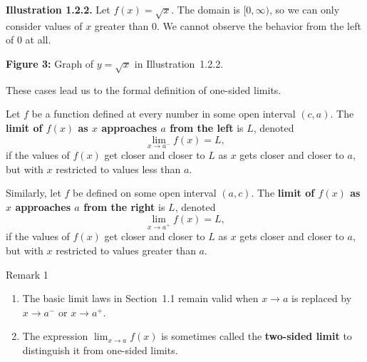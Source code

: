 \medskip
\textbf{Illustration 1.2.2.}
Let \(f(x) = \sqrt{x}\). The domain is \([0, \infty)\), so we can only consider values of \(x\) greater than 0. We cannot observe the behavior from the left of 0 at all.

\begin{center}

\smallskip
\textbf{Figure 3:} Graph of \(y = \sqrt{x}\) in Illustration~1.2.2.
\end{center}

\bigskip

These cases lead us to the formal definition of one-sided limits.

\medskip
Let \(f\) be a function defined at every number in some open interval \((c, a)\). The \textbf{limit of \(f(x)\) as \(x\) approaches \(a\) from the left} is \(L\), denoted
\[
\lim_{x \to a^{-}} f(x) = L,
\]
if the values of \(f(x)\) get closer and closer to \(L\) as \(x\) gets closer and closer to \(a\), but with \(x\) restricted to values less than \(a\).

Similarly, let \(f\) be defined on some open interval \((a, c)\). The \textbf{limit of \(f(x)\) as \(x\) approaches \(a\) from the right} is \(L\), denoted
\[
\lim_{x \to a^{+}} f(x) = L,
\]
if the values of \(f(x)\) get closer and closer to \(L\) as \(x\) gets closer and closer to \(a\), but with \(x\) restricted to values greater than \(a\).


\begin{remarkbox}{Remark 1}

\begin{enumerate}
    \item The basic limit laws in Section~1.1 remain valid when \(x \to a\) is replaced by \(x \to a^{-}\) or \(x \to a^{+}\).
    \item The expression \(\displaystyle\lim_{x \to a} f(x)\) is sometimes called the \textbf{two-sided limit} to distinguish it from one-sided limits.
\end{enumerate}
\end{remarkbox}


